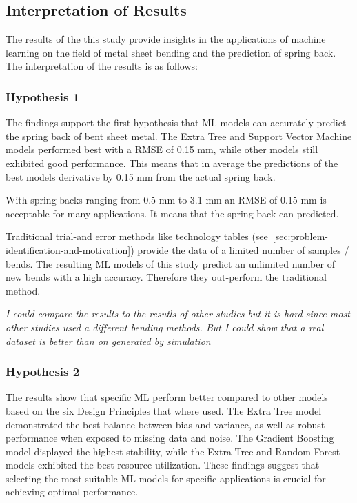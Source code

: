 \subsection{Interpretation of Results}\label{subsec:interpretation-of-results}

The results of the this study provide insights in the applications of machine learning on the field of metal sheet
bending and the prediction of spring back.
The interpretation of the results is as follows:

\subsubsection{Hypothesis 1}
The findings support the first hypothesis that \ac{ML} models can accurately predict the spring back of bent sheet
metal.
The Extra Tree and Support Vector Machine models performed best with a RMSE of 0.15 mm, while other models still
exhibited good performance.
This means that in average the predictions of the best models derivative by 0.15 mm from the actual spring back.

With spring backs ranging from 0.5 mm to 3.1 mm an RMSE of 0.15 mm is acceptable for many applications. It means that
the spring back can predicted.

Traditional trial-and error methods like technology tables (see~\ref{sec:problem-identification-and-motivation})
provide the data of a limited number of samples / bends.
The resulting \ac{ML} models of this study predict an unlimited number of new bends with a high accuracy.
Therefore they out-perform the traditional method.

\textit{I could compare the results to the resutls of other studies but it is hard since most other studies used a
different bending methods. But I could show that a real dataset is better than on generated by simulation}

\subsubsection{Hypothesis 2}

The results show that specific \ac{ML} perform better compared to other models based on the six Design Principles
that where used.
The Extra Tree model demonstrated the best balance between bias and variance, as well as robust performance when
exposed to missing data and noise.
The Gradient Boosting model displayed the highest stability, while the Extra Tree and Random Forest models exhibited
the best resource utilization.
These findings suggest that selecting the most suitable ML models for specific applications is crucial for achieving
optimal performance.

